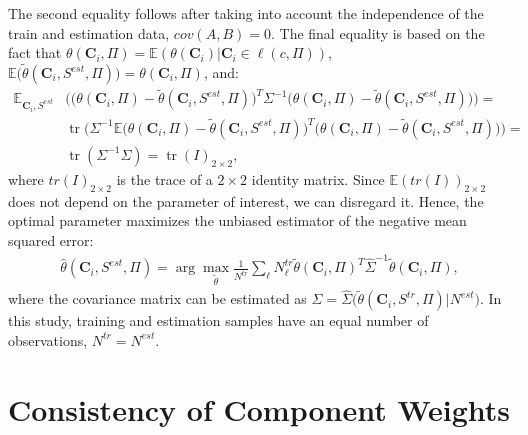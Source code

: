 \documentclass[12pt]{article}
\begin{document}
The second equality follows after taking into account the independence of the train and estimation data,  $cov(A, B) = 0$. The final equality is based on the fact that $\theta(\mathbf{C}_i, \Pi) = \mathbb{E}(\theta(\mathbf{C}_i)|\mathbf{C}_i \in \ell(c, \Pi))$, $\mathbb{E}\big(\widetilde{\theta}(\mathbf{C}_i, S^{est}, \Pi)\big) = \theta(\mathbf{C}_i, \Pi)$,  and:
\begin{align*}
  \mathbb{E}_{\mathbf{C}_i, S^{est}}&\bigg(\big(\theta(\mathbf{C}_i, \Pi) - \widetilde{\theta}(\mathbf{C}_i, S^{est}, \Pi)\big)^T\Sigma^{-1}\big(\theta(\mathbf{C}_i, \Pi) - \widetilde{\theta}(\mathbf{C}_i, S^{est}, \Pi)\big)\bigg) = \\
  &\operatorname{tr}\bigg(\Sigma^{-1} \mathbb{E}\big(\theta(\mathbf{C}_i, \Pi) - \widetilde{\theta}(\mathbf{C}_i, S^{est}, \Pi)\big)^T\big(\theta(\mathbf{C}_i, \Pi) - \widetilde{\theta}(\mathbf{C}_i, S^{est}, \Pi)\big)\bigg) = \\
  & \operatorname{tr}(\Sigma^{-1}\Sigma) = \operatorname{tr}(I)_{2\times2},
\end{align*}
where $tr(I)_{2\times2}$ is the trace of a $2 \times 2$ identity matrix. Since $\mathbb{E}(tr(I))_{2 \times 2}$ does not depend on the parameter of interest, we can disregard it. Hence, the optimal parameter maximizes the unbiased estimator of the negative mean squared error:
\begin{align}\label{eq_loss_theta}
    \hat{\theta}(\mathbf{C}_i, S^{est}, \Pi) = \arg\max_{\widetilde{\theta}} \frac{1}{N^{tr}} \sum_{\ell} N^{tr}_{\ell}\widetilde{\theta}(\mathbf{C}_i,  \Pi)^{T}\widehat{\Sigma}^{-1}\widetilde{\theta}(\mathbf{C}_i, \Pi),
\end{align}
where the covariance matrix can be estimated as $\hat{\Sigma} =  \hat{\Sigma}\big(\tilde{\theta}(\mathbf{C}_i, S^{tr}, \Pi)|N^{est}\big)$. In this study, training and estimation samples have an equal number of observations, $N^{tr} = N^{est}$.  


\section{Consistency of Component Weights }\label{app_brillinger}
\end{document}
